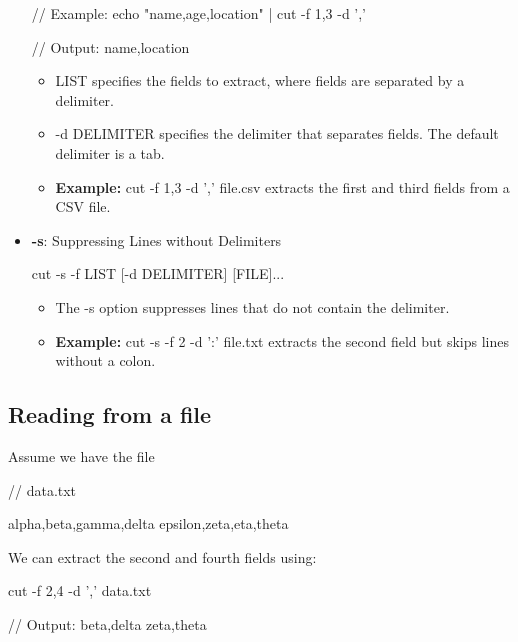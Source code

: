\documentclass{report}
\begin{document}
\begin{itemize}
\begin{bashcode}
            // Example:
            echo "name,age,location" | cut -f 1,3 -d ','

            // Output: name,location
            \end{bashcode}
            \begin{itemize}
                \item LIST specifies the fields to extract, where fields are separated by a delimiter.
                \item -d DELIMITER specifies the delimiter that separates fields. The default delimiter is a tab.
                \item \textbf{Example:} cut -f 1,3 -d ',' file.csv extracts the first and third fields from a CSV file.
            \end{itemize}
        \item \textbf{-s}: Suppressing Lines without Delimiters
            \bigbreak \noindent 
            \begin{bashcode}
            cut -s -f LIST [-d DELIMITER] [FILE]...
            \end{bashcode}
            \begin{itemize}
                \item The -s option suppresses lines that do not contain the delimiter.
                \item \textbf{Example:} cut -s -f 2 -d ':' file.txt extracts the second field but skips lines without a colon.
            \end{itemize}
    \end{itemize}

    \bigbreak \noindent 
    \subsection{Reading from a file}
    \bigbreak \noindent 
    Assume we have the file
    \bigbreak \noindent 
    \begin{bashcode}
    // data.txt

    alpha,beta,gamma,delta
    epsilon,zeta,eta,theta
    \end{bashcode}
    \bigbreak \noindent 
    We can extract the second and fourth fields using:
    \bigbreak \noindent 
    \begin{bashcode}
    cut -f 2,4 -d ',' data.txt 

    // Output:
    beta,delta
    zeta,theta
    \end{bashcode}

    \bigbreak \noindent 
\end{document}
